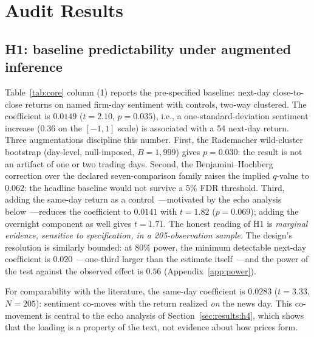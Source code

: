 \section{Audit Results}\label{sec:results}

\subsection{H1: baseline predictability under augmented inference}\label{sec:results:h1}

Table~\ref{tab:core} column (1) reports the pre-specified baseline: next-day close-to-close returns on named firm-day sentiment with controls, two-way clustered. The coefficient is $0.0149$ ($t=2.10$, $p=0.035$), i.e., a one-standard-deviation sentiment increase (0.36 on the $[-1,1]$ scale) is associated with a 54 \bps{} next-day return. Three augmentations discipline this number. First, the Rademacher wild-cluster bootstrap (day-level, null-imposed, $B=1{,}999$) gives $p=0.030$: the result is not an artifact of one or two trading days. Second, the Benjamini--Hochberg correction over the declared seven-comparison family raises the implied $q$-value to $0.062$: the headline baseline would not survive a 5\% FDR threshold. Third, adding the same-day return as a control~---motivated by the echo analysis below~---reduces the coefficient to $0.0141$ with $t=1.82$ ($p=0.069$); adding the overnight component as well gives $t=1.71$. The honest reading of H1 is \emph{marginal evidence, sensitive to specification, in a 205-observation sample}. The design's resolution is similarly bounded: at 80\% power, the minimum detectable next-day coefficient is $0.020$~---one-third larger than the estimate itself~---and the power of the test against the observed effect is $0.56$ (Appendix~\ref{app:power}).

For comparability with the literature, the same-day coefficient is $0.0283$ ($t=3.33$, $N=205$): sentiment co-moves with the return realized \emph{on} the news day. This co-movement is central to the echo analysis of Section~\ref{sec:results:h4}, which shows that the loading is a property of the text, not evidence about how prices form.

